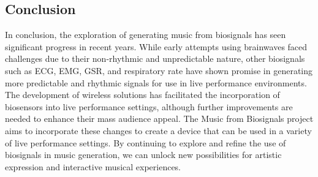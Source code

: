 \subsection{Conclusion}
In conclusion, the exploration of generating music from biosignals has seen significant progress in recent years.
While early attempts using brainwaves faced challenges due to their non-rhythmic and unpredictable nature,
other biosignals such as ECG, EMG, GSR, and respiratory rate have shown promise in generating more predictable and rhythmic signals for use in live performance environments.
The development of wireless solutions has facilitated the incorporation of biosensors into live performance settings,
although further improvements are needed to enhance their mass audience appeal.
The Music from Biosignals project aims to incorporate these changes to create a device that can be used in a variety of live performance settings.
By continuing to explore and refine the use of biosignals in music generation, we can unlock new possibilities for artistic expression and interactive musical experiences.
